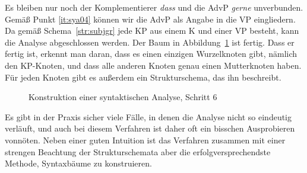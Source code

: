 Es bleiben nur noch der Komplementierer \textit{dass} und die AdvP \textit{gerne} unverbunden.
Gemäß Punkt \ref{it:sya04} können wir die AdvP als Angabe in die VP eingliedern.
Da gemäß Schema~\ref{str:subjgr} jede KP aus einem K und einer VP besteht, kann die Analyse abgeschlossen werden.
Der Baum in Abbildung~\ref{fig:sya06} ist fertig.
Dass er fertig ist, erkennt man daran, dass es einen einzigen Wurzelknoten gibt, nämlich den KP-Knoten, und dass alle anderen Knoten genau einen Mutterknoten haben.
Für jeden Knoten gibt es außerdem ein Strukturschema, das ihn beschreibt.

\begin{figure}
  \caption{Konstruktion einer syntaktischen Analyse, Schritt 6}
  \label{fig:sya06}
\end{figure}

Es gibt in der Praxis sicher viele Fälle, in denen die Analyse nicht so eindeutig verläuft, und auch bei diesem Verfahren ist daher oft ein bisschen Ausprobieren vonnöten.
Neben einer guten Intuition ist das Verfahren zusammen mit einer strengen Beachtung der Strukturschemata aber die erfolgversprechendste Methode, Syntaxbäume zu konstruieren.

\Zusammenfassung

